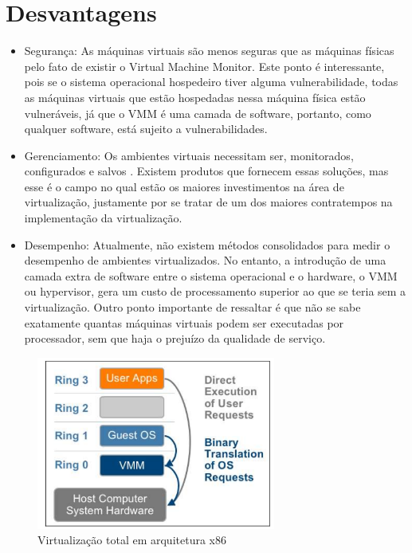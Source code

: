  
\section{Desvantagens}
\begin{itemize}
\item Segurança: As máquinas virtuais são menos seguras que as máquinas físicas pelo fato de existir o Virtual Machine Monitor. Este ponto é interessante, pois se o sistema operacional hospedeiro tiver alguma vulnerabilidade, todas as máquinas virtuais que estão hospedadas nessa máquina física estão vulneráveis, já que o VMM é uma camada de software, portanto,
como qualquer software, está sujeito a vulnerabilidades.
   \item Gerenciamento: Os ambientes virtuais necessitam ser, monitorados, configurados e salvos . Existem produtos que fornecem essas soluções, mas esse é o campo no qual estão os maiores investimentos na área de virtualização, justamente por se tratar de um dos maiores contratempos na implementação da virtualização.
    \item Desempenho: Atualmente, não existem métodos consolidados para medir o desempenho de ambientes virtualizados. No entanto, a introdução de uma camada extra de software entre o sistema operacional e o hardware, o VMM ou hypervisor, gera um custo de processamento superior ao que se teria sem a virtualização. Outro ponto importante de ressaltar é que não se sabe exatamente quantas máquinas virtuais podem ser executadas por processador, sem que haja o prejuízo da qualidade de serviço.
    \end{itemize}
 
 
\begin{figure}
	\begin{center}
    	\includegraphics[width=0.7\textwidth]{virtualizacao}
    \end{center}
    \caption{Virtualização total em arquitetura x86~\cite{ferrazani}}
    \label{fig: virtualizacao}

\end{figure}
    
